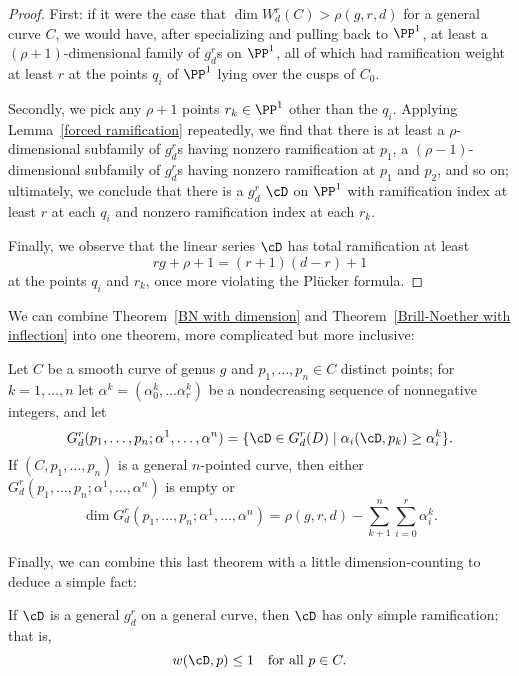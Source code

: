 \begin{proof}
First: if it were the case that $\dim W^r_d(C) > \rho(g,r,d)$ for a general curve $C$, we would have, after specializing and pulling back to $\PP^1$, at least a $(\rho + 1)$-dimensional family of $g^r_d$s on $\PP^1$, all of which had ramification weight at least $r$ at the points $q_i$ of $\PP^1$ lying over the cusps of $C_0$. 

Secondly, we pick any $\rho + 1$ points $r_k \in \PP^1$ other than the $q_i$. Applying Lemma~\ref{forced ramification} repeatedly, we find that there is at least a $\rho$-dimensional subfamily of $g^r_d$s having nonzero ramification at $p_1$, a $(\rho - 1)$-dimensional subfamily of $g^r_d$s having nonzero ramification at $p_1$ and $p_2$, and so on; ultimately, we conclude that there is a $g^r_d$ $\cD$ on $\PP^1$ with ramification index at least $r$ at each $q_i$ and nonzero ramification index at each $r_k$. 

Finally, we observe that the linear series $\cD$ has total ramification at least
$$
rg + \rho + 1 = (r+1)(d-r)+1
$$
at the points $q_i$ and $r_k$, once more violating the Pl\"ucker formula.
\end{proof}

We can combine Theorem~\ref{BN with dimension} and Theorem~\ref{Brill-Noether with inflection} into one theorem, more complicated but more inclusive:

\begin{theorem}\label{BN with inflection and dimension}
Let $C$ be a smooth curve of genus $g$ and $p_1,\dots,p_n \in C$ distinct points; for $k = 1,\dots,n$ let $\alpha^k = (\alpha^k_0,\dots\alpha^k_r)$ be a nondecreasing sequence of nonnegative integers, and let
$$
G^r_d(p_1,\dots,p_n; \alpha^1,\dots,\alpha^n) = \{\cD \in G^r_d(D) \mid \alpha_i(\cD, p_k) \geq \alpha^k_i \}.
$$
If $(C, p_1,\dots,p_n)$ is a general $n$-pointed curve, then either $G^r_d(p_1,\dots,p_n; \alpha^1,\dots,\alpha^n)$ is empty or
$$
\dim G^r_d(p_1,\dots,p_n; \alpha^1,\dots,\alpha^n) = \rho(g,r,d) - \sum_{k+1}^n \sum_{i=0}^r \alpha^k_i.
$$
\end{theorem}

Finally, we can combine this last theorem with a little dimension-counting to deduce a simple fact:

\begin{theorem}
If $\cD$ is a general $g^r_d$ on a general curve, then $\cD$ has only simple ramification; that is,
$$
w(\cD, p) \leq 1 \quad \text{for all } p \in C.
$$
\end{theorem}

